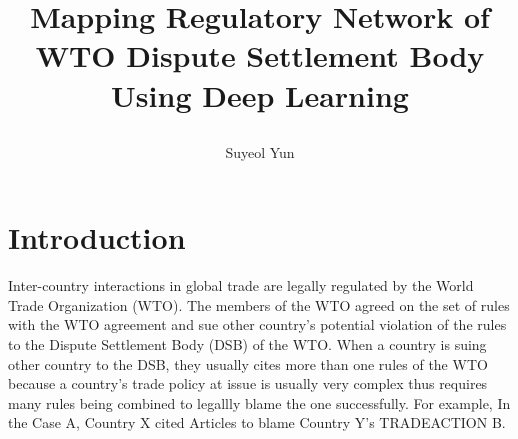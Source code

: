 \documentclass[12pt,letterpaper]{article}
\newcommand{\tit}{
\bf 
Mapping Regulatory Network of WTO Dispute Settlement Body Using Deep Learning
}
\newcommand\spacingset[1]{\renewcommand{\baselinestretch}
{#1}\small\normalsize}
\begin{document}
\spacingset{1.25}

\setcounter{page}{0}
\vspace{-.1in}

{\title{
    \tit
  }
  \author{Suyeol Yun
  }
  \maketitle
}

\thispagestyle{empty}
\vspace{-.1in}

\begin{abstract}


\end{abstract}

\spacingset{1.5} %

\section{Introduction}

Inter-country interactions in global trade are legally regulated by the World Trade Organization (WTO).
The members of the WTO agreed on the set of rules with the WTO agreement and sue other country's potential
violation of the rules to the Dispute Settlement Body (DSB) of the WTO.
When a country is suing other country to the DSB, they usually cites more than one rules of the WTO
because a country's trade policy at issue is usually very complex thus requires many rules being combined to legallly blame the one successfully.
For example, In the Case A, Country X cited {Articles} to blame Country Y's TRADEACTION B.
\end{document}
